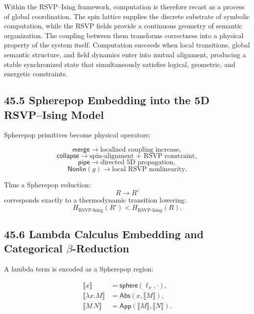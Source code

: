 \documentclass[12pt,letterpaper]{article}
\theoremstyle{remark}
\begin{document}
Within the RSVP--Ising framework, computation is therefore recast as a process of global coordination. The spin lattice supplies the discrete substrate of symbolic computation, while the RSVP fields provide a continuous geometry of semantic organization. The coupling between them transforms correctness into a physical property of the system itself. Computation succeeds when local transitions, global semantic structure, and field dynamics enter into mutual alignment, producing a stable synchronized state that simultaneously satisfies logical, geometric, and energetic constraints.

\subsection{45.5 Spherepop Embedding into the 5D RSVP--Ising Model}

Spherepop primitives become physical operators:

\[
\mathsf{merge} \longrightarrow \text{localized coupling increase},
\]
\[
\mathsf{collapse} \longrightarrow \text{spin-alignment + RSVP constraint},
\]
\[
\mathsf{pipe} \longrightarrow \text{directed 5D propagation},
\]
\[
\mathsf{Nonlin}(g) \longrightarrow \text{local RSVP nonlinearity}.
\]

Thus a Spherepop reduction:
\[
R \to R'
\]
corresponds exactly to a thermodynamic transition lowering:
\[
H_{\text{RSVP-Ising}}(R') < H_{\text{RSVP-Ising}}(R).
\]

\subsection{45.6 Lambda Calculus Embedding and Categorical $\beta$-Reduction}

A lambda term is encoded as a Spherepop region:

\[
\begin{aligned}
\llbracket x \rrbracket &= \mathsf{sphere}(\ell_x, \cdot),\\
\llbracket \lambda x.M \rrbracket &= \mathsf{Abs}(x, \llbracket M \rrbracket),\\
\llbracket M\,N \rrbracket &= \mathsf{App}(\llbracket M \rrbracket, \llbracket N \rrbracket).
\end{aligned}
\]
\end{document}

